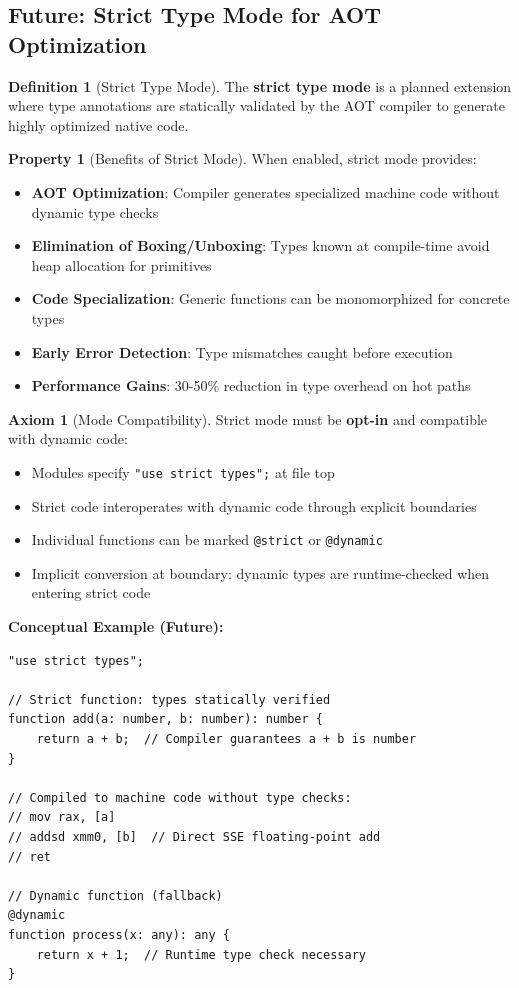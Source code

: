 \documentclass[12pt,a4paper]{article}
\theoremstyle{definition}
\newtheorem{definition}{Definition}[section]
\newtheorem{axiom}{Axiom}[section]
\newtheorem{property}{Property}[section]
\begin{document}
\subsection{Future: Strict Type Mode for AOT Optimization}

\begin{definition}[Strict Type Mode] \label{def:strict_mode}
The \textbf{strict type mode} is a planned extension where type annotations are statically validated by the AOT compiler to generate highly optimized native code.
\end{definition}

\begin{property}[Benefits of Strict Mode]
When enabled, strict mode provides:
\begin{itemize}[leftmargin=*]
    \item \textbf{AOT Optimization}: Compiler generates specialized machine code without dynamic type checks
    \item \textbf{Elimination of Boxing/Unboxing}: Types known at compile-time avoid heap allocation for primitives
    \item \textbf{Code Specialization}: Generic functions can be monomorphized for concrete types
    \item \textbf{Early Error Detection}: Type mismatches caught before execution
    \item \textbf{Performance Gains}: 30-50\% reduction in type overhead on hot paths
\end{itemize}
\end{property}

\begin{axiom}[Mode Compatibility]
Strict mode must be \textbf{opt-in} and compatible with dynamic code:
\begin{itemize}[leftmargin=*]
    \item Modules specify \texttt{"use strict types";} at file top
    \item Strict code interoperates with dynamic code through explicit boundaries
    \item Individual functions can be marked \texttt{@strict} or \texttt{@dynamic}
    \item Implicit conversion at boundary: dynamic types are runtime-checked when entering strict code
\end{itemize}
\end{axiom}

\textbf{Conceptual Example (Future):}
\begin{lstlisting}[language=Dryad]
"use strict types";

// Strict function: types statically verified
function add(a: number, b: number): number {
    return a + b;  // Compiler guarantees a + b is number
}

// Compiled to machine code without type checks:
// mov rax, [a]
// addsd xmm0, [b]  // Direct SSE floating-point add
// ret

// Dynamic function (fallback)
@dynamic
function process(x: any): any {
    return x + 1;  // Runtime type check necessary
}
\end{lstlisting}
\end{document}
